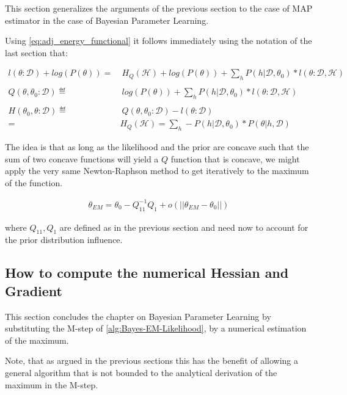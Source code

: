 \documentclass[11pt]{article}
\begin{document}
\begin{article}
This section generalizes the arguments of the previous section to
the case of MAP estimator in the case of Bayesian Parameter
Learning.

Using \ref{eq:adj_energy_functional} it follows immediately using the
notation of the last section that:

\begin{align} \label{eq:likelihood_energy_map_iterative}
l (\theta: \mathscr{D}) + log(P(\theta)) =& \ H_Q (\mathscr {H}) + log(P(\theta)) + \sum_h P(h | \mathscr{D}, \theta_0) * l (\theta: \mathscr{D}, \mathscr{H})\\
\nonumber\\
Q(\theta, \theta_0 : \mathscr{D}) \eqdef& \ log(P(\theta)) + \sum_h P(h | \mathscr{D}, \theta_0) * l (\theta: \mathscr{D}, \mathscr{H})\\
\nonumber\\  
H(\theta_0, \theta: \mathscr{D}) \eqdef& \ Q(\theta, \theta_0 : \mathscr{D}) - l (\theta: \mathscr{D}) \\
                                 =& H_Q (\mathscr {H}) = \sum_h - P(h | \mathscr{D}, \theta_0) * P(\theta | h, \mathscr{D}) \nonumber
\end{align}

The idea is that as long as the likelihood and the prior are
concave such that the sum of two concave functions will yield a \(Q\)
function that is concave, we might apply the very same
Newton-Raphson method to get iteratively to the maximum of the
function.

\begin{align} 
 \theta_{EM}  = \theta_{0} - Q_{11}^{-1} Q_1 + o(||\theta_{EM} - \theta_{0}||) \label{eq:em-iterative}
\end{align}

where \(Q_{11}, Q_1\) are defined as in the previous section and
need now to account for the prior distribution influence.



\subsection{How to compute the numerical Hessian and Gradient}
\label{sec:orgb5c0665}

This section concludes the chapter on Bayesian Parameter Learning
by substituting the M-step of \ref{alg:Bayes-EM-Likelihood}, by a
numerical estimation of the maximum.

Note, that as argued in the previous sections this has the benefit
of allowing a general algorithm that is not bounded to the
analytical derivation of the maximum in the M-step.


\end{article}
\end{document}
